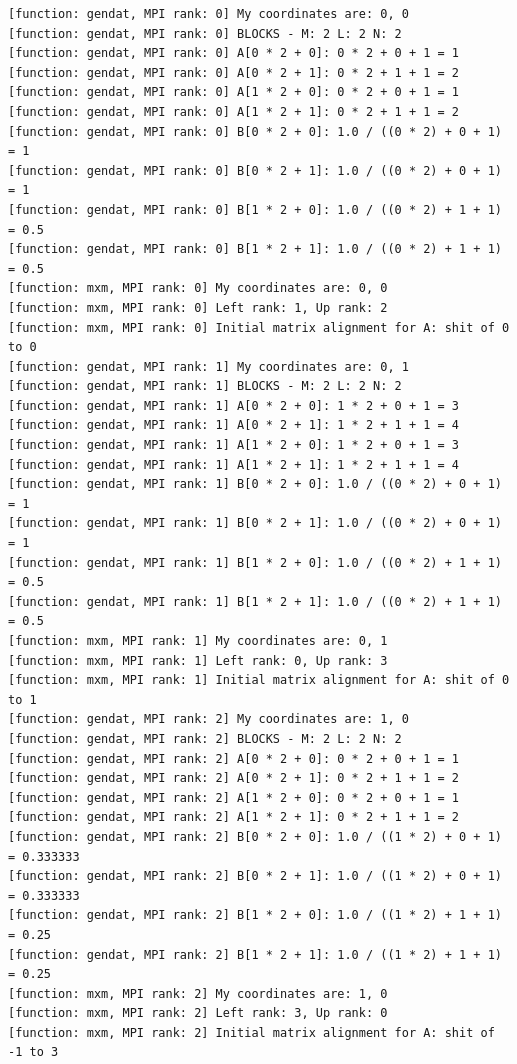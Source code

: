 \begin{lstlisting}
[function: gendat, MPI rank: 0] My coordinates are: 0, 0
[function: gendat, MPI rank: 0] BLOCKS - M: 2 L: 2 N: 2
[function: gendat, MPI rank: 0] A[0 * 2 + 0]: 0 * 2 + 0 + 1 = 1
[function: gendat, MPI rank: 0] A[0 * 2 + 1]: 0 * 2 + 1 + 1 = 2
[function: gendat, MPI rank: 0] A[1 * 2 + 0]: 0 * 2 + 0 + 1 = 1
[function: gendat, MPI rank: 0] A[1 * 2 + 1]: 0 * 2 + 1 + 1 = 2
[function: gendat, MPI rank: 0] B[0 * 2 + 0]: 1.0 / ((0 * 2) + 0 + 1) = 1
[function: gendat, MPI rank: 0] B[0 * 2 + 1]: 1.0 / ((0 * 2) + 0 + 1) = 1
[function: gendat, MPI rank: 0] B[1 * 2 + 0]: 1.0 / ((0 * 2) + 1 + 1) = 0.5
[function: gendat, MPI rank: 0] B[1 * 2 + 1]: 1.0 / ((0 * 2) + 1 + 1) = 0.5
[function: mxm, MPI rank: 0] My coordinates are: 0, 0
[function: mxm, MPI rank: 0] Left rank: 1, Up rank: 2
[function: mxm, MPI rank: 0] Initial matrix alignment for A: shit of 0 to 0
[function: gendat, MPI rank: 1] My coordinates are: 0, 1
[function: gendat, MPI rank: 1] BLOCKS - M: 2 L: 2 N: 2
[function: gendat, MPI rank: 1] A[0 * 2 + 0]: 1 * 2 + 0 + 1 = 3
[function: gendat, MPI rank: 1] A[0 * 2 + 1]: 1 * 2 + 1 + 1 = 4
[function: gendat, MPI rank: 1] A[1 * 2 + 0]: 1 * 2 + 0 + 1 = 3
[function: gendat, MPI rank: 1] A[1 * 2 + 1]: 1 * 2 + 1 + 1 = 4
[function: gendat, MPI rank: 1] B[0 * 2 + 0]: 1.0 / ((0 * 2) + 0 + 1) = 1
[function: gendat, MPI rank: 1] B[0 * 2 + 1]: 1.0 / ((0 * 2) + 0 + 1) = 1
[function: gendat, MPI rank: 1] B[1 * 2 + 0]: 1.0 / ((0 * 2) + 1 + 1) = 0.5
[function: gendat, MPI rank: 1] B[1 * 2 + 1]: 1.0 / ((0 * 2) + 1 + 1) = 0.5
[function: mxm, MPI rank: 1] My coordinates are: 0, 1
[function: mxm, MPI rank: 1] Left rank: 0, Up rank: 3
[function: mxm, MPI rank: 1] Initial matrix alignment for A: shit of 0 to 1
[function: gendat, MPI rank: 2] My coordinates are: 1, 0
[function: gendat, MPI rank: 2] BLOCKS - M: 2 L: 2 N: 2
[function: gendat, MPI rank: 2] A[0 * 2 + 0]: 0 * 2 + 0 + 1 = 1
[function: gendat, MPI rank: 2] A[0 * 2 + 1]: 0 * 2 + 1 + 1 = 2
[function: gendat, MPI rank: 2] A[1 * 2 + 0]: 0 * 2 + 0 + 1 = 1
[function: gendat, MPI rank: 2] A[1 * 2 + 1]: 0 * 2 + 1 + 1 = 2
[function: gendat, MPI rank: 2] B[0 * 2 + 0]: 1.0 / ((1 * 2) + 0 + 1) = 0.333333
[function: gendat, MPI rank: 2] B[0 * 2 + 1]: 1.0 / ((1 * 2) + 0 + 1) = 0.333333
[function: gendat, MPI rank: 2] B[1 * 2 + 0]: 1.0 / ((1 * 2) + 1 + 1) = 0.25
[function: gendat, MPI rank: 2] B[1 * 2 + 1]: 1.0 / ((1 * 2) + 1 + 1) = 0.25
[function: mxm, MPI rank: 2] My coordinates are: 1, 0
[function: mxm, MPI rank: 2] Left rank: 3, Up rank: 0
[function: mxm, MPI rank: 2] Initial matrix alignment for A: shit of -1 to 3

\end{lstlisting}
